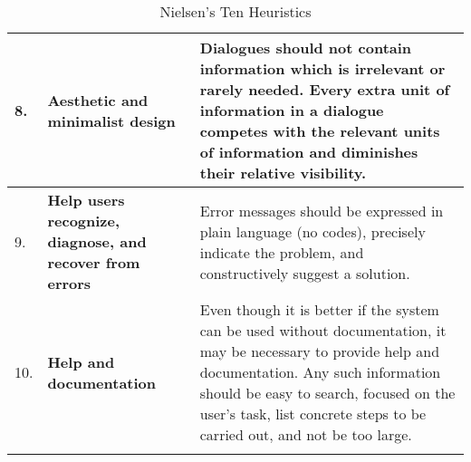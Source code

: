 \begin{longtable}{|p{0.4cm} | p{5cm}|p{8cm}|}
8.& \textbf{Aesthetic and minimalist design} & Dialogues should not contain information which is irrelevant or rarely needed. Every extra unit of information in a dialogue competes with the relevant units of information and diminishes their relative visibility.\\ \hline

9.& \textbf{Help users recognize, diagnose, and recover from errors} & Error messages should be expressed in plain language (no codes), precisely indicate the problem, and constructively suggest a solution.\\ \hline

10.& \textbf{Help and documentation} & Even though it is better if the system can be used without documentation, it may be necessary to provide help and documentation. Any such information should be easy to search, focused on the user's task, list concrete steps to be carried out, and not be too large. \\
\hline

\caption{Nielsen's Ten Heuristics}
\end{longtable}
